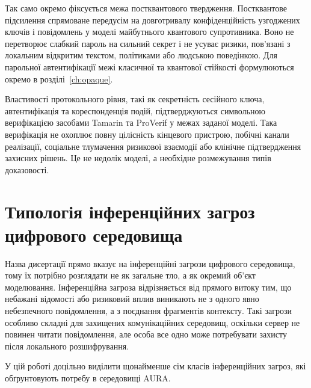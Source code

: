 Так само окремо фіксується межа постквантового твердження. Постквантове підсилення спрямоване передусім на довготривалу конфіденційність узгоджених ключів і повідомлень у моделі майбутнього квантового супротивника. Воно не перетворює слабкий пароль на сильний секрет і не усуває ризики, пов'язані з локальним відкритим текстом, політиками або людською поведінкою. Для парольної автентифікації межі класичної та квантової стійкості формулюються окремо в розділі~\ref{ch:opaque}.

Властивості протокольного рівня, такі як секретність сесійного ключа, автентифікація та кореспонденція подій, підтверджуються символьною верифікацією засобами Tamarin та ProVerif \cite{meier2013tamarin,blanchet2016proverif} у межах заданої моделі. Така верифікація не охоплює повну цілісність кінцевого пристрою, побічні канали реалізації, соціальне тлумачення ризикової взаємодії або клінічне підтвердження захисних рішень. Це не недолік моделі, а необхідне розмежування типів доказовості.

\section{Типологія інференційних загроз цифрового середовища}
\label{sec:inference-threat-taxonomy}

Назва дисертації прямо вказує на інференційні загрози цифрового середовища, тому їх потрібно розглядати не як загальне тло, а як окремий об'єкт моделювання. Інференційна загроза відрізняється від прямого витоку тим, що небажані відомості або ризиковий вплив виникають не з одного явно небезпечного повідомлення, а з поєднання фрагментів контексту. Такі загрози особливо складні для захищених комунікаційних середовищ, оскільки сервер не повинен читати повідомлення, але особа все одно може потребувати захисту після локального розшифрування.

У цій роботі доцільно виділити щонайменше сім класів інференційних загроз, які обґрунтовують потребу в середовищі AURA.

